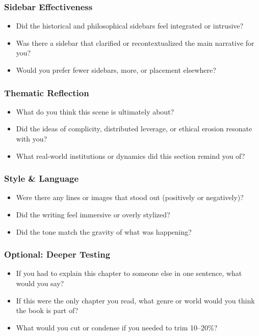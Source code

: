 \subsubsection{Sidebar Effectiveness}

\begin{itemize}
  \item Did the historical and philosophical sidebars feel integrated or intrusive?
  \item Was there a sidebar that clarified or recontextualized the main narrative for you?
  \item Would you prefer fewer sidebars, more, or placement elsewhere?
\end{itemize}

\subsubsection{Thematic Reflection}

\begin{itemize}
  \item What do you think this scene is ultimately about?
  \item Did the ideas of complicity, distributed leverage, or ethical erosion resonate with you?
  \item What real-world institutions or dynamics did this section remind you of?
\end{itemize}

\subsubsection{Style \& Language}

\begin{itemize}
  \item Were there any lines or images that stood out (positively or negatively)?
  \item Did the writing feel immersive or overly stylized?
  \item Did the tone match the gravity of what was happening?
\end{itemize}

\subsubsection{Optional: Deeper Testing}

\begin{itemize}
  \item If you had to explain this chapter to someone else in one sentence, what would you say?
  \item If this were the only chapter you read, what genre or world would you think the book is part of?
  \item What would you cut or condense if you needed to trim 10–20\%?
\end{itemize}








